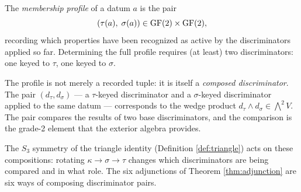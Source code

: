 \begin{definition}\label{def:profile}
The \emph{membership profile} of a datum $a$ is the pair
\begin{equation}
  (\tau(a),\; \sigma(a)) \in \operatorname{GF}(2) \times \operatorname{GF}(2),
\end{equation}
recording which properties have been recognized as active
by the discriminators applied so far. Determining the
full profile requires (at least) two discriminators: one
keyed to $\tau$, one keyed to $\sigma$.

The profile is not merely a recorded tuple: it is itself
a \emph{composed discriminator}. The pair $(d_\tau, d_\sigma)$
--- a $\tau$-keyed discriminator and a $\sigma$-keyed
discriminator applied to the same datum --- corresponds
to the wedge product $d_\tau \wedge d_\sigma \in
\bigwedge^2 V$. The pair compares the results of two
base discriminators, and the comparison is the grade-2
element that the exterior algebra provides.

The $S_3$ symmetry of the triangle identity
(Definition \ref{def:triangle}) acts on these
compositions: rotating $\kappa \to \sigma \to \tau$
changes which discriminators are being compared
and in what role. The six adjunctions of Theorem
\ref{thm:adjunction} are six ways of composing
discriminator pairs.
\end{definition}

